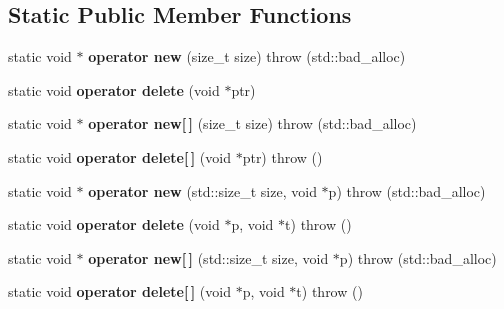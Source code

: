 \subsection*{Static Public Member Functions}
\begin{DoxyCompactItemize}
\item 
static void $\ast$ {\bfseries operator new} (size\+\_\+t size)  throw (std\+::bad\+\_\+alloc)\hypertarget{classirr_1_1core_1_1STriangleMeshCollider_a1e0cd5e0cfe4cc179f6eb1a161dfec5d}{}\label{classirr_1_1core_1_1STriangleMeshCollider_a1e0cd5e0cfe4cc179f6eb1a161dfec5d}

\item 
static void {\bfseries operator delete} (void $\ast$ptr)\hypertarget{classirr_1_1core_1_1STriangleMeshCollider_a153bcf0b965189fcff3558c25f1efb33}{}\label{classirr_1_1core_1_1STriangleMeshCollider_a153bcf0b965189fcff3558c25f1efb33}

\item 
static void $\ast$ {\bfseries operator new\mbox{[}$\,$\mbox{]}} (size\+\_\+t size)  throw (std\+::bad\+\_\+alloc)\hypertarget{classirr_1_1core_1_1STriangleMeshCollider_adab5c0e15c9d5e5af1e074e1e0137efe}{}\label{classirr_1_1core_1_1STriangleMeshCollider_adab5c0e15c9d5e5af1e074e1e0137efe}

\item 
static void {\bfseries operator delete\mbox{[}$\,$\mbox{]}} (void $\ast$ptr)  throw ()\hypertarget{classirr_1_1core_1_1STriangleMeshCollider_a7bb4e3571032153c9310de547a84f85f}{}\label{classirr_1_1core_1_1STriangleMeshCollider_a7bb4e3571032153c9310de547a84f85f}

\item 
static void $\ast$ {\bfseries operator new} (std\+::size\+\_\+t size, void $\ast$p)  throw (std\+::bad\+\_\+alloc)\hypertarget{classirr_1_1core_1_1STriangleMeshCollider_a06fa17023c339488ee0d9c0587248bef}{}\label{classirr_1_1core_1_1STriangleMeshCollider_a06fa17023c339488ee0d9c0587248bef}

\item 
static void {\bfseries operator delete} (void $\ast$p, void $\ast$t)  throw ()\hypertarget{classirr_1_1core_1_1STriangleMeshCollider_ac16eb9c9a23a6611b31b37bb8deaf37e}{}\label{classirr_1_1core_1_1STriangleMeshCollider_ac16eb9c9a23a6611b31b37bb8deaf37e}

\item 
static void $\ast$ {\bfseries operator new\mbox{[}$\,$\mbox{]}} (std\+::size\+\_\+t size, void $\ast$p)  throw (std\+::bad\+\_\+alloc)\hypertarget{classirr_1_1core_1_1STriangleMeshCollider_af67e264416e87ec9c6c13b88910fd28d}{}\label{classirr_1_1core_1_1STriangleMeshCollider_af67e264416e87ec9c6c13b88910fd28d}

\item 
static void {\bfseries operator delete\mbox{[}$\,$\mbox{]}} (void $\ast$p, void $\ast$t)  throw ()\hypertarget{classirr_1_1core_1_1STriangleMeshCollider_a40576cb013ba8994520ebedecf1491a4}{}\label{classirr_1_1core_1_1STriangleMeshCollider_a40576cb013ba8994520ebedecf1491a4}

\end{DoxyCompactItemize}
